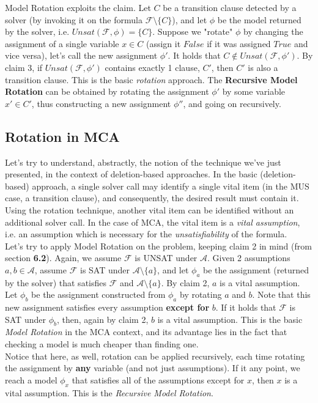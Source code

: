 \documentclass[]{article}
\begin{document}
	Model Rotation exploits the claim. Let $ C $ be a transition clause detected by a solver (by invoking it on the formula $ \mathcal{F} \setminus \{C\} $), and let $ \phi $ be the model returned by the solver, i.e. $ Unsat(\mathcal{F}, \phi) = \{C\} $. Suppose we "rotate" $ \phi $ by changing the assignment of a single variable $ x \in C $ (assign it $ False $ if it was assigned $ True $ and vice versa), let's call the new assignment $ \phi' $. It holds that $ C \notin  Unsat(\mathcal{F}, \phi') $. By claim 3, if $ Unsat(\mathcal{F}, \phi') $ contains exactly 1 clause, $ C' $, then $ C' $ is also a transition clause. This is the basic \textit{rotation} approach. The \textbf{Recursive Model Rotation} \cite{Rotation} can be obtained by rotating the assignment $ \phi' $ by some variable $ x' \in C' $, thus constructing a new assignment $ \phi'' $, and going on recursively.
	
	\subsection{Rotation in MCA}
	Let's try to understand, abstractly, the notion of the technique we've just presented, in the context of deletion-based approaches. In the basic (deletion-based) approach, a single solver call may identify a single vital item (in the MUS case, a transition clause), and consequently, the desired result must contain it. Using the rotation technique, another vital item can be identified without an additional solver call. In the case of MCA, the vital item is a \textit{vital assumption}, i.e. an assumption which is necessary for the \textit{unsatisfiability} of the formula.\\
	Let's try to apply Model Rotation on the problem, keeping claim 2 in mind (from section \textbf{6.2}). Again, we assume $ \mathcal{F} $ is UNSAT under $ \mathcal{A} $. Given 2 assumptions $ a,b \in \mathcal{A} $, assume $ \mathcal{F} $ is SAT under $ \mathcal{A}\setminus \{a\} $, and let $ \phi _a $ be the assignment (returned by the solver) that satisfies $ \mathcal{F} $ and $ \mathcal{A}\setminus \{a\} $. By claim 2, $ a $ is a vital assumption. Let  $ \phi _b $ be the assignment constructed from $ \phi _a $ by rotating $ a $ and $ b $. Note that this new assignment satisfies every assumption \textbf{except for} $ b $. If it holds that $ \mathcal{F} $ is SAT under $ \phi_b $, then, again by claim 2, $ b $ is a vital assumption. This is the basic \textit{Model Rotation} in the MCA context, and its advantage lies in the fact that checking a model is much cheaper than finding one.\\Notice that here, as well, rotation can be applied recursively, each time rotating the assignment by \textbf{any} variable (and not just assumptions). If it any point, we reach a model $ \phi _x $ that satisfies all of the assumptions except for $ x $, then $ x $ is a vital assumption. This is the \textit{Recursive Model Rotation}.
\end{document}
